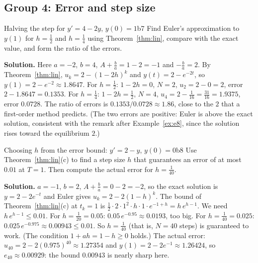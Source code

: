 \documentclass[11pt]{article}
\begin{document}
\subsection*{Group 4: Error and step size}

\begin{exmp}{Halving the step for $y'=4-2y$, $y(0)=1$}{b7}
Find Euler's approximation to $y(1)$ for $h=\frac12$ and $h=\frac14$ using Theorem~\ref{thm:lin}, compare with the exact value, and form the ratio of the errors.

\textbf{Solution.} Here $a=-2$, $b=4$, $A+\frac ba=1-2=-1$ and $-\frac ba=2$. By Theorem~\ref{thm:lin}, $u_k=2-(1-2h)^k$ and $y(t)=2-e^{-2t}$, so $y(1)=2-e^{-2}\approx1.8647$. For $h=\frac12$: $1-2h=0$, $N=2$, $u_2=2-0=2$, error $2-1.8647=0.1353$. For $h=\frac14$: $1-2h=\frac12$, $N=4$, $u_4=2-\frac1{16}=\frac{31}{16}=1.9375$, error $0.0728$. The ratio of errors is $0.1353/0.0728\approx1.86$, close to the $2$ that a first-order method predicts. (The two errors are positive: Euler is above the exact solution, consistent with the remark after Example~\ref{ex:e8}, since the solution rises toward the equilibrium $2$.)
\end{exmp}

\begin{exmp}{Choosing $h$ from the error bound: $y'=2-y$, $y(0)=0$}{b8}
Use Theorem~\ref{thm:lin}(c) to find a step size $h$ that guarantees an error of at most $0.01$ at $T=1$. Then compute the actual error for $h=\frac1{40}$.

\textbf{Solution.} $a=-1$, $b=2$, $A+\frac ba=0-2=-2$, so the exact solution is $y=2-2e^{-t}$ and Euler gives $u_k=2-2(1-h)^k$. The bound of Theorem~\ref{thm:lin}(c) at $t_k=1$ is $\frac12\cdot2\cdot1^2\cdot h\cdot1\cdot e^{-1+h}=h\,e^{h-1}$. We need $h\,e^{h-1}\le0.01$. For $h=\frac1{20}=0.05$: $0.05\,e^{-0.95}\approx0.0193$, too big. For $h=\frac1{40}=0.025$: $0.025\,e^{-0.975}\approx0.00943\le0.01$. So $h=\frac1{40}$ (that is, $N=40$ steps) is guaranteed to work. (The condition $1+ah=1-h\ge0$ holds.)
The actual error: $u_{40}=2-2(0.975)^{40}\approx1.27354$ and $y(1)=2-2e^{-1}\approx1.26424$, so $e_{40}\approx0.00929$: the bound $0.00943$ is nearly sharp here.
\end{exmp}
\end{document}

